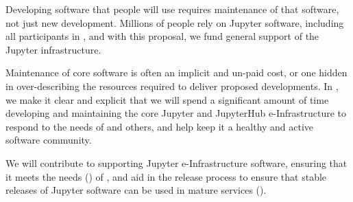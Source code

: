 \begin{task}[
  title=Maintenance of Jupyter and JupyterHub,
  id=maintenance,
  lead=SRL,
  PM=48,
  wphases={0-48},
  partners={XFEL,UPSUD,QS}
]
  Developing software that people will use requires maintenance of that software,
  not just new development.
  Millions of people rely on Jupyter software,
  including all participants in \TheProject,
  and with this proposal, we fund general support of the Jupyter infrastructure.

  Maintenance of core software is often an implicit and un-paid cost,
  or one hidden in over-describing the resources required to deliver
  proposed developments.
  In \TheProject, we make it clear and explicit that we will spend a significant amount
  of time developing and maintaining the core Jupyter and JupyterHub
  e-Infrastructure to respond to the needs of \TheProject and others,
  and help keep it a healthy and active software community.

  We will contribute to supporting Jupyter e-Infrastructure software,
  ensuring that it meets the needs ()
  of \TheProject,
  and aid in the release process to ensure that stable releases
  of Jupyter software can be used in mature \TheProject services
  ().
\end{task}
